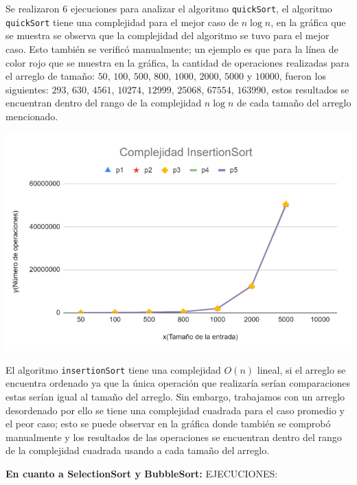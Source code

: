 \documentclass[12pt]{article}
\begin{document}
\par\vspace{0.4cm}
Se realizaron 6 ejecuciones para analizar el algoritmo \texttt{quickSort}, el algoritmo \texttt{quickSort} tiene una complejidad para el mejor caso de $n \log n$, en la gráfica que se muestra se observa que la complejidad del algoritmo se tuvo para el mejor caso. Esto también se verificó manualmente; un ejemplo es que para la línea de color rojo que se muestra en la gráfica, la cantidad de operaciones realizadas para el arreglo de tamaño: $50$, $100$, $500$, $800$, $1000$, $2000$, $5000$ y $10000$, fueron los siguientes: $293$, $630$, $4561$, $10274$, $12999$, $25068$, $67554$, $163990$, estos resultados se encuentran dentro del rango de la complejidad $n\log n$ de cada tamaño del arreglo mencionado.
\par\vspace{0.4cm}
\includegraphics[width=15cm]{Images/Graf_IS.png}
\par\vspace{0.4cm}
El algoritmo \texttt{insertionSort} tiene una complejidad \( O(n) \) lineal, si el arreglo se encuentra ordenado ya que la única operación que realizaría serían comparaciones estas serían igual al tamaño del arreglo. Sin embargo, trabajamos con un arreglo desordenado por ello se tiene una complejidad cuadrada para el caso promedio y el peor caso; esto se puede observar en la gráfica donde también se comprobó manualmente y los resultados de las operaciones se encuentran dentro del rango de la complejidad cuadrada usando a cada tamaño del arreglo.
\par\vspace{0.6cm}
\textbf{En cuanto a SelectionSort y BubbleSort:}
EJECUCIONES:
\par\vspace{0.4cm}
\end{document}
